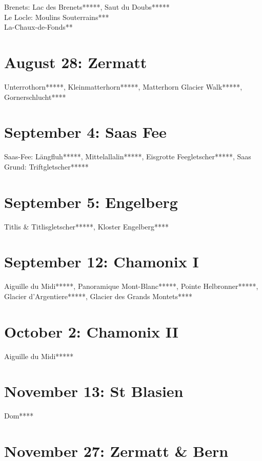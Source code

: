 Brenets: Lac des Brenets*****, Saut du Doubs*****\\
Le Locle: Moulins Souterrains***\\
La-Chaux-de-Fonds**

\section{August 28: Zermatt}
\label{Zermatt2010}

Unterrothorn*****, Kleinmatterhorn*****, Matterhorn Glacier Walk*****, Gornerschlucht****

\section{September 4: Saas Fee}
\label{2010SaasFee}

Saas-Fee: L\"angfluh*****, Mittelallalin*****, Eisgrotte Feegletscher*****, Saas Grund: Triftgletscher*****

\section{September 5: Engelberg}
\label{2010Titlis}

Titlis \& Titlisgletscher*****, Kloster Engelberg****

\section{September 12: Chamonix I}
\label{2010ChamonixI}

Aiguille du Midi*****, Panoramique Mont-Blanc*****, Pointe Helbronner*****, Glacier d'Argentiere*****, Glacier des Grands Montets****

\section{October 2: Chamonix II}
\label{2010ChamonixII}

Aiguille du Midi*****

\section{November 13: St Blasien}
\label{2010StBlasien}

Dom****

\section{November 27: Zermatt \& Bern}
\label{2010ZermattBern}

